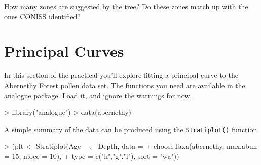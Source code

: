 \documentclass[a4paper,10pt]{article}
\begin{document}
How many zones are suggested by the tree? Do these zones match up with the ones CONISS identified?

\section{Principal Curves}
In this section of the practical you'll explore fitting a principal curve to
the Abernethy Forest pollen data set. The functions you need are available in
the \textsf{analogue} package. Load it, and ignore the warnings for now.
\begin{Schunk}
\begin{Sinput}
> library("analogue")
> data(abernethy)
\end{Sinput}
\end{Schunk}

A simple summary of the data can be produced using the \texttt{Stratiplot()}
function
\begin{Schunk}
\begin{Sinput}
> (plt <- Stratiplot(Age ~ . - Depth, data =
+                    chooseTaxa(abernethy, max.abun = 15, n.occ = 10),
+                    type = c("h","g","l"), sort = "wa"))
\end{Sinput}
\end{Schunk}
\end{document}
